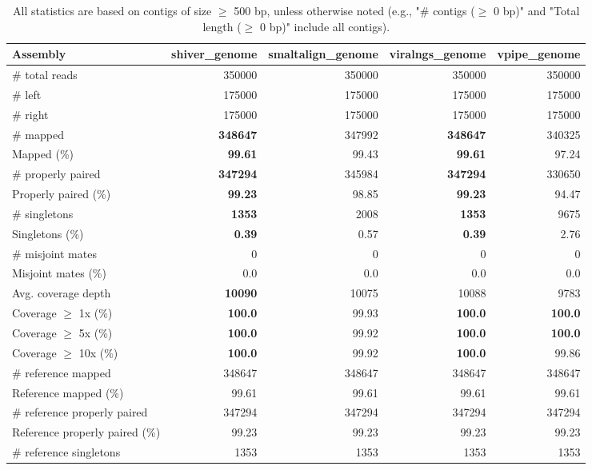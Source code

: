 \documentclass[12pt,a4paper]{article}
\begin{document}
\begin{table}[ht]
\begin{center}
\caption{All statistics are based on contigs of size $\geq$ 500 bp, unless otherwise noted (e.g., "\# contigs ($\geq$ 0 bp)" and "Total length ($\geq$ 0 bp)" include all contigs).}
\begin{tabular}{|l*{4}{|r}|}
\hline
Assembly & shiver\_genome & smaltalign\_genome & viralngs\_genome & vpipe\_genome \\ \hline
\# total reads & 350000 & 350000 & 350000 & 350000 \\ \hline
\# left & 175000 & 175000 & 175000 & 175000 \\ \hline
\# right & 175000 & 175000 & 175000 & 175000 \\ \hline
\# mapped & {\bf 348647} & 347992 & {\bf 348647} & 340325 \\ \hline
Mapped (\%) & {\bf 99.61} & 99.43 & {\bf 99.61} & 97.24 \\ \hline
\# properly paired & {\bf 347294} & 345984 & {\bf 347294} & 330650 \\ \hline
Properly paired (\%) & {\bf 99.23} & 98.85 & {\bf 99.23} & 94.47 \\ \hline
\# singletons & {\bf 1353} & 2008 & {\bf 1353} & 9675 \\ \hline
Singletons (\%) & {\bf 0.39} & 0.57 & {\bf 0.39} & 2.76 \\ \hline
\# misjoint mates & 0 & 0 & 0 & 0 \\ \hline
Misjoint mates (\%) & 0.0 & 0.0 & 0.0 & 0.0 \\ \hline
Avg. coverage depth & {\bf 10090} & 10075 & 10088 & 9783 \\ \hline
Coverage $\geq$ 1x (\%) & {\bf 100.0} & 99.93 & {\bf 100.0} & {\bf 100.0} \\ \hline
Coverage $\geq$ 5x (\%) & {\bf 100.0} & 99.92 & {\bf 100.0} & {\bf 100.0} \\ \hline
Coverage $\geq$ 10x (\%) & {\bf 100.0} & 99.92 & {\bf 100.0} & 99.86 \\ \hline
\# reference mapped & 348647 & 348647 & 348647 & 348647 \\ \hline
Reference mapped (\%) & 99.61 & 99.61 & 99.61 & 99.61 \\ \hline
\# reference properly paired & 347294 & 347294 & 347294 & 347294 \\ \hline
Reference properly paired (\%) & 99.23 & 99.23 & 99.23 & 99.23 \\ \hline
\# reference singletons & 1353 & 1353 & 1353 & 1353 \\ \hline

\end{tabular}
\end{center}
\end{table}
\end{document}
